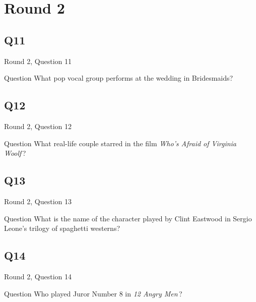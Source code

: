 \documentclass[11pt]{beamer}
\begin{document}
\section{Round 2}
    

\subsection*{Q11}
\begin{frame}[t]{Round 2, Question 11}
\vspace{2em}
\begin{block}{Question}
What pop vocal group performs at the wedding in Bridesmaids?
\end{block}
\end{frame}
    

\subsection*{Q12}
\begin{frame}[t]{Round 2, Question 12}
\vspace{2em}
\begin{block}{Question}
What real-life couple starred in the film \emph{Who's Afraid of Virginia Woolf}\,?
\end{block}
\end{frame}
    

\subsection*{Q13}
\begin{frame}[t]{Round 2, Question 13}
\vspace{2em}
\begin{block}{Question}
What is the name of the character played by Clint Eastwood in Sergio Leone's trilogy of spaghetti westerns?
\end{block}
\end{frame}
    

\subsection*{Q14}
\begin{frame}[t]{Round 2, Question 14}
\vspace{2em}
\begin{block}{Question}
Who played Juror Number 8 in \emph{12 Angry Men}\,?
\end{block}
\end{frame}
    
\end{document}
